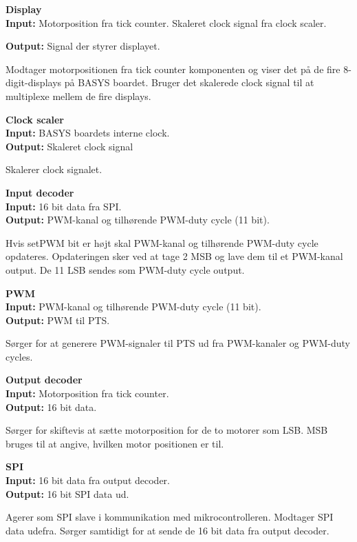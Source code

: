 \textbf{Display}\\
\textbf{Input:} Motorposition fra tick counter. Skaleret clock signal fra clock 
scaler.

\textbf{Output:} Signal der styrer displayet.

Modtager motorpositionen fra tick counter komponenten og viser det på de fire 8-digit-displays 
på BASYS boardet. Bruger det skalerede clock signal til at multiplexe mellem de 
fire displays.

\textbf{Clock scaler}\\
\textbf{Input:} BASYS boardets interne clock.\\
\textbf{Output:} Skaleret clock signal

Skalerer clock signalet.

\textbf{Input decoder}\\
\textbf{Input:} 16 bit data fra SPI.\\
\textbf{Output:} PWM-kanal og tilhørende PWM-duty cycle (11 bit).

Hvis setPWM bit er højt skal PWM-kanal og tilhørende PWM-duty cycle opdateres.
Opdateringen sker ved at tage 2 MSB og lave dem til et PWM-kanal output. De 11 
LSB sendes som PWM-duty cycle output.

\textbf{PWM}\\
\textbf{Input:} PWM-kanal og tilhørende PWM-duty cycle (11 bit).\\
\textbf{Output:} PWM til PTS.

Sørger for at generere PWM-signaler til PTS ud fra PWM-kanaler og PWM-duty cycles.

\textbf{Output decoder}\\
\textbf{Input:} Motorposition fra tick counter.\\
\textbf{Output:} 16 bit data.

Sørger for skiftevis at sætte motorposition for de to motorer som LSB.
MSB bruges til at angive, hvilken motor positionen er til.

\textbf{SPI}\\
\textbf{Input:} 16 bit data fra output decoder. \\%
\textbf{Output:} 16 bit SPI data ud.

Agerer som SPI slave i kommunikation med mikrocontrolleren.
Modtager SPI data udefra. Sørger samtidigt for at sende de 16 bit data fra output decoder.


